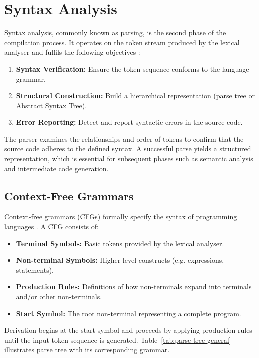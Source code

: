 \section{Syntax Analysis}

Syntax analysis, commonly known as parsing, is the second phase of the compilation process. It operates on the token stream produced by the lexical analyser and fulfils the following objectives \cite{aho2007compilers}:

\begin{enumerate}
\item \textbf{Syntax Verification:} Ensure the token sequence conforms to the language grammar.
\item \textbf{Structural Construction:} Build a hierarchical representation (parse tree or Abstract Syntax Tree).
\item \textbf{Error Reporting:} Detect and report syntactic errors in the source code.
\end{enumerate}

The parser examines the relationships and order of tokens to confirm that the source code adheres to the defined syntax. A successful parse yields a structured representation, which is essential for subsequent phases such as semantic analysis and intermediate code generation.

\subsection{Context-Free Grammars}

Context-free grammars (CFGs) formally specify the syntax of programming languages \cite{aho2007compilers}. A CFG consists of:

\begin{itemize}
\item \textbf{Terminal Symbols:} Basic tokens provided by the lexical analyser.
\item \textbf{Non-terminal Symbols:} Higher-level constructs (e.g. expressions, statements).
\item \textbf{Production Rules:} Definitions of how non-terminals expand into terminals and/or other non-terminals.
\item \textbf{Start Symbol:} The root non-terminal representing a complete program.
\end{itemize}

Derivation begins at the start symbol and proceeds by applying production rules until the input token sequence is generated. Table~\ref{tab:parse-tree-general} illustrates parse tree with its corresponding grammar.

